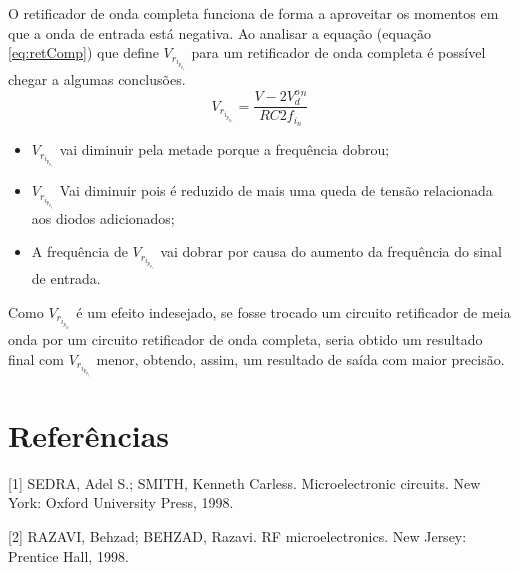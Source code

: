 \documentclass{abntex2}
\begin{document}
O retificador de onda completa funciona de forma a aproveitar os momentos em que a onda de entrada está negativa. Ao analisar a equação (equação  \ref{eq:retComp}) que define $V_r_i_p_p_l_e$ para um retificador de onda completa é possível
chegar a algumas conclusões.
\begin{equation}
  V_r_i_p_p_l_e = \frac{V-2V_d^o^n}{RC2f_i_n}
  \label{eq:retComp}
\end{equation}

\begin{itemize}
  \item $V_r_i_p_p_l_e$ vai diminuir pela metade porque a frequência dobrou;
  \item $V_r_i_p_p_l_e$ Vai diminuir pois é reduzido de mais uma queda de tensão relacionada aos diodos adicionados;
  \item A frequência de $V_r_i_p_p_l_e$ vai dobrar por causa do aumento da frequência do sinal de entrada.
\end{itemize}

Como $V_r_i_p_p_l_e$ é um efeito indesejado, se fosse trocado um circuito retificador de meia onda por um circuito retificador de onda completa,
seria obtido um resultado final com $V_r_i_p_p_l_e$ menor, obtendo, assim, um resultado de saída com maior precisão.

\section*{Referências}


[1] SEDRA, Adel S.; SMITH, Kenneth Carless. Microelectronic circuits. New York: Oxford University Press, 1998.

[2] RAZAVI, Behzad; BEHZAD, Razavi. RF microelectronics. New Jersey: Prentice Hall, 1998.
\end{document}
